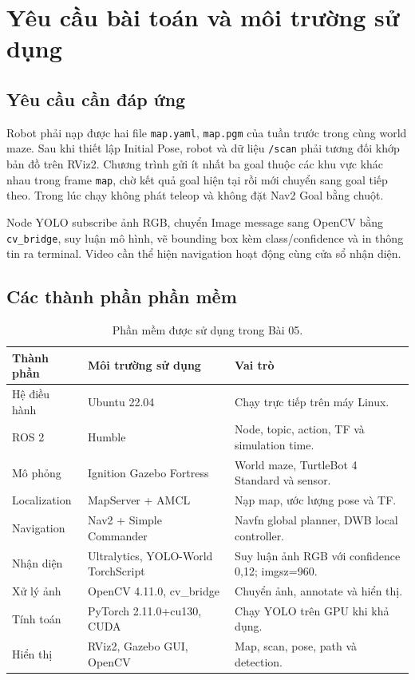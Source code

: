 \documentclass[a4paper,11pt]{article}
\newcommand{\code}[1]{\nolinkurl{#1}}
\begin{document}
\section{Yêu cầu bài toán và môi trường sử dụng}
\subsection{Yêu cầu cần đáp ứng}

Robot phải nạp được hai file \code{map.yaml}, \code{map.pgm} của tuần trước trong
cùng world maze. Sau khi thiết lập Initial Pose, robot và dữ liệu \code{/scan}
phải tương đối khớp bản đồ trên RViz2. Chương trình gửi ít nhất ba goal thuộc các
khu vực khác nhau trong frame \code{map}, chờ kết quả goal hiện tại rồi mới chuyển
sang goal tiếp theo. Trong lúc chạy không phát teleop và không đặt Nav2 Goal bằng chuột.

Node YOLO subscribe ảnh RGB, chuyển Image message sang OpenCV bằng
\code{cv_bridge}, suy luận mô hình, vẽ bounding box kèm class/confidence và in
thông tin ra terminal. Video cần thể hiện navigation hoạt động cùng cửa sổ nhận diện.

\subsection{Các thành phần phần mềm}
\begin{table}[H]\centering\small
\begin{tabular}{@{}p{2.5cm}p{4.4cm}p{8.8cm}@{}}\toprule
Thành phần & Môi trường sử dụng & Vai trò\\\midrule
Hệ điều hành & Ubuntu 22.04 & Chạy trực tiếp trên máy Linux.\\
ROS 2 & Humble & Node, topic, action, TF và simulation time.\\
Mô phỏng & Ignition Gazebo Fortress & World maze, TurtleBot 4 Standard và sensor.\\
Localization & MapServer + AMCL & Nạp map, ước lượng pose và TF.\\
Navigation & Nav2 + Simple Commander & Navfn global planner, DWB local controller.\\
Nhận diện & Ultralytics, YOLO-World TorchScript & Suy luận ảnh RGB với confidence 0,12; imgsz=960.\\
Xử lý ảnh & OpenCV 4.11.0, cv\_bridge & Chuyển ảnh, annotate và hiển thị.\\
Tính toán & PyTorch 2.11.0+cu130, CUDA & Chạy YOLO trên GPU khi khả dụng.\\
Hiển thị & RViz2, Gazebo GUI, OpenCV & Map, scan, pose, path và detection.\\\bottomrule
\end{tabular}
\caption{Phần mềm được sử dụng trong Bài 05.}
\end{table}
\end{document}
